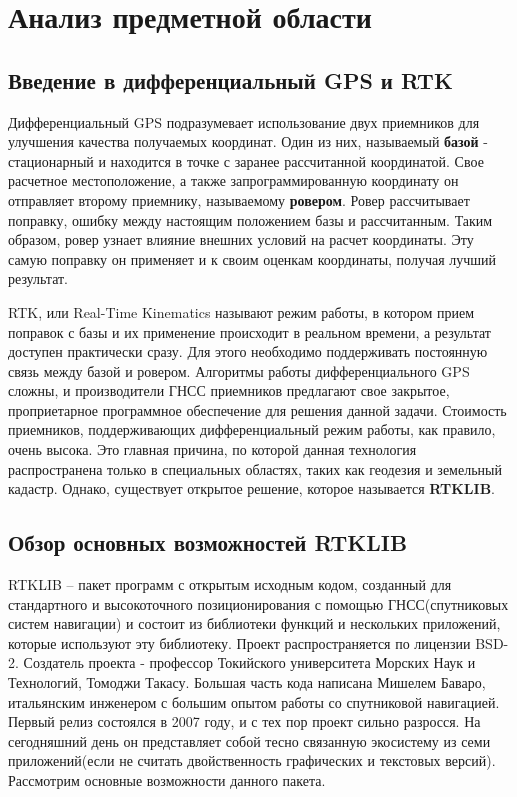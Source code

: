 \chapter{Анализ предметной области} \label{chapt1}

\section{Введение в дифференциальный GPS и RTK} \label{sect1_1}

Дифференциальный GPS подразумевает использование двух приемников для улучшения качества получаемых координат. Один из них, называемый \textbf{базой} - стационарный и находится в точке с заранее рассчитанной координатой. Свое расчетное местоположение, а также запрограммированную координату он отправляет второму приемнику, называемому \textbf{ровером}. Ровер рассчитывает поправку, ошибку между настоящим положением базы и рассчитанным. Таким образом, ровер узнает влияние внешних условий на расчет координаты. Эту самую поправку он применяет и к своим оценкам координаты, получая лучший результат.

RTK, или Real-Time Kinematics называют режим работы, в котором прием поправок с базы и их применение происходит в реальном времени, а результат доступен практически сразу. Для этого необходимо поддерживать постоянную связь между базой и ровером. Алгоритмы работы дифференциального GPS сложны, и производители ГНСС приемников предлагают свое закрытое, проприетарное программное обеспечение для решения данной задачи. Стоимость приемников, поддерживающих дифференциальный режим работы, как правило, очень высока. Это главная причина, по которой данная технология распространена только в специальных областях, таких как геодезия и земельный кадастр. Однако, существует открытое решение, которое называется \textbf{RTKLIB}.

\section{Обзор основных возможностей RTKLIB} \label{sect1_2}

RTKLIB – пакет программ с открытым исходным кодом, созданный для стандартного и высокоточного позиционирования с помощью ГНСС(спутниковых систем навигации) и состоит из библиотеки функций и нескольких приложений, которые используют эту библиотеку. Проект распространяется по лицензии BSD-2. Создатель проекта -  профессор Токийского университета Морских Наук и Технологий, Томоджи Такасу. Большая часть кода написана Мишелем Баваро, итальянским инженером с большим опытом работы со спутниковой навигацией. Первый релиз состоялся в 2007 году, и с тех пор проект сильно разросся. На сегодняшний день он представляет собой тесно связанную экосистему из семи приложений(если не считать двойственность графических и текстовых версий). Рассмотрим основные возможности данного пакета.

